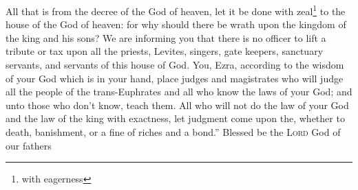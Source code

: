 \begin{enumerate*}[mode=unboxed]
     All that is from the decree of the God of heaven, let it be done with zeal\footnote{with eagerness} to the house of the God of heaven: for why should there be wrath upon the kingdom of the king and his sons?%
     We are informing you that there is no officer to lift a tribute or tax upon all the priests, Levites, singers, gate keepers, sanctuary servants, and servants of this house of God.%
     You, Ezra, according to the wisdom of your God which is in your hand, place judges and magistrates who will judge all the people of the trans-Euphrates and all who know the laws of your God; and unto those who don't know, teach them.%
     All who will not do the law of your God and the law of the king with exactness, let judgment come upon the, whether to death, banishment, or a fine of riches and a bond.''%
     Blessed be the \textsc{Lord} God of our fathers%
\end{enumerate*}
